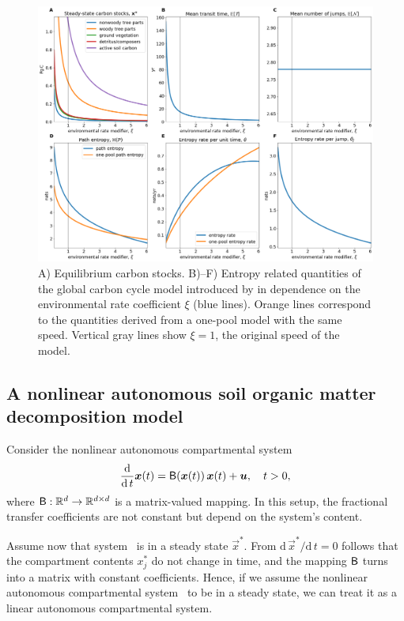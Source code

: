 \documentclass[smallextended]{svjour3}
\makeatletter
\renewcommand*{\eqref}[1]{%
  \hyperref[{#1}]{\textup{\tagform@{\ref*{#1}}}}%
}
\newcommand{\R}{\mathbb{R}}
\newcommand{\deriv}[1]{\frac{\operatorname{d}}{\operatorname{d}#1}}
\makeatother
\begin{document}
\begin{figure}[htbp]
    \centering
    \includegraphics[width=1.0\linewidth]{figs/Emanuel_entropies}
    \caption[Entropy related quantities of the model introduced by \citet{Emanuel1981}.]{
    A) Equilibrium carbon stocks. B)--F) Entropy related quantities of the global carbon cycle model introduced by \citet{Emanuel1981} in dependence on the environmental rate coefficient $\xi$ (blue lines).
    Orange lines correspond to the quantities derived from a one-pool model with the same speed.
    Vertical gray lines show $\xi=1$, the original speed of the model.}
    \label{fig:Emanuel_entropies}
\end{figure}

\subsection{A nonlinear autonomous soil organic matter decomposition model}
\label{subsec:example_2}
Consider the nonlinear autonomous compartmental system
\begin{equation}\label{eqn:nonlinear_inh}
  \deriv{t} \vec{x}(t) = \tens{B}(\vec{x}(t))\,\vec{x}(t) + \vec{u}, \quad t>0,
\end{equation}
where $\tens{B}:\R^d\to \R^{d\times d}$ is a matrix-valued mapping.
In this setup, the fractional transfer coefficients are not constant but depend on the system's content.

Assume now that system~\eqref{eqn:nonlinear_inh} is in a steady state $\vec{x}^\ast$.
From $\mathrm{d}\,\vec{x}^\ast/\mathrm{d}\,t = 0$ follows that the compartment contents $x^\ast_j$ do not change in time, and the mapping $\mathsf{B}$ turns into a matrix with constant coefficients. 
Hence, if we assume the nonlinear autonomous compartmental system~\eqref{eqn:nonlinear_inh} to be in a steady state, we can treat it as a linear autonomous compartmental system.
\end{document}
